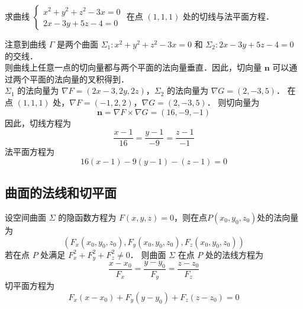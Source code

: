 \documentclass[12pt, a4paper, oneside, UTF8]{ctexbook}
\begin{document}
\begin{example}
    求曲线 $\begin{cases}
        x^2 + y^2 + z^2 -3x =0\\
        2x - 3y + 5z - 4 = 0
    \end{cases}$ 在点 $(1,1,1)$ 处的切线与法平面方程．
\end{example}
\begin{solution}
    注意到曲线 $\Gamma$ 是两个曲面 $\Sigma_1: x^2 + y^2 + z^2 -3x =0$ 和 $\Sigma_2: 2x - 3y + 5z - 4 = 0$ 的交线．\\
    则曲线上任意一点的切向量都与两个平面的法向量垂直．因此，切向量 $\bm{n}$ 可以通过两个平面的法向量的叉积得到．\\
    $\Sigma_1$ 的法向量为 $\nabla F = (2x - 3, 2y, 2z)$，$\Sigma_2$ 的法向量为 $\nabla G = (2, -3, 5)$．
    在点 $(1,1,1)$ 处，$\nabla F = (-1, 2, 2)$，$\nabla G = (2, -3, 5)$．
    则切向量为
    \[ \bm{n} = \nabla F \times \nabla G = (16, -9, -1) \]
    因此，切线方程为
    \[ \boxed{\frac{x-1}{16} = \frac{y-1}{-9} = \frac{z-1}{-1}} \]
    法平面方程为
    \[ \boxed{16(x-1) - 9(y-1) - (z-1) = 0} \]

\end{solution}
\subsection{曲面的法线和切平面}
\begin{theorem}
    设空间曲面 $\Sigma$ 的隐函数方程为 $F(x, y, z) = 0$，则在点$P(x_0, y_0, z_0)$处的法向量为
    \[ \left( F_x(x_0, y_0, z_0), F_y(x_0, y_0, z_0), F_z(x_0, y_0, z_0) \right) \]
    若在点 $P$ 处满足 $F_x^2 + F_y^2 + F_z^2 \ne 0$．
    则曲面 $\Sigma$ 在点 $P$ 处的法线方程为
    \[
        \frac{x - x_0}{F_x} = \frac{y - y_0}{F_y} = \frac{z - z_0}{F_z}
    \]
    切平面方程为
    \[
        F_x(x - x_0) + F_y(y - y_0) + F_z(z - z_0) = 0
    \]
\end{theorem}



\ifx\allfiles\undefined
\end{document}
